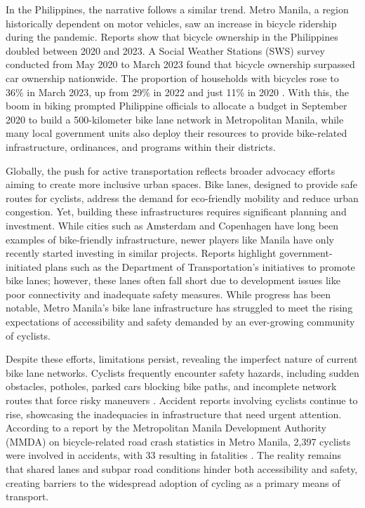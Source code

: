 In the Philippines, the narrative follows a similar trend. Metro Manila, a region historically dependent on motor vehicles, saw an increase in bicycle ridership during the pandemic. Reports show that bicycle ownership in the Philippines doubled between 2020 and 2023. A Social Weather Stations (SWS) survey conducted from May 2020 to March 2023 found that bicycle ownership surpassed car ownership nationwide. The proportion of households with bicycles rose to 36\% in March 2023, up from 29\% in 2022 and just 11\% in 2020 \citep{Cervantes:2023}. With this, the boom in biking prompted Philippine officials to allocate a budget in September 2020 to build a 500-kilometer bike lane network in Metropolitan Manila, while many local government units also deploy their resources to provide bike-related infrastructure, ordinances, and programs within their districts.

Globally, the push for active transportation reflects broader advocacy efforts aiming to create more inclusive urban spaces. Bike lanes, designed to provide safe routes for cyclists, address the demand for eco-friendly mobility and reduce urban congestion. Yet, building these infrastructures requires significant planning and investment. While cities such as Amsterdam and Copenhagen have long been examples of bike-friendly infrastructure, newer players like Manila have only recently started investing in similar projects. Reports highlight government-initiated plans such as the Department of Transportation's initiatives to promote bike lanes; however, these lanes often fall short due to development issues like poor connectivity and inadequate safety measures. While progress has been notable, Metro Manila's bike lane infrastructure has struggled to meet the rising expectations of accessibility and safety demanded by an ever-growing community of cyclists.

Despite these efforts, limitations persist, revealing the imperfect nature of current bike lane networks. Cyclists frequently encounter safety hazards, including sudden obstacles, potholes, parked cars blocking bike paths, and incomplete network routes that force risky maneuvers \citep{MNLBulletin:2023}. Accident reports involving cyclists continue to rise, showcasing the inadequacies in infrastructure that need urgent attention. According to a report by the Metropolitan Manila Development Authority (MMDA) on bicycle-related road crash statistics in Metro Manila, 2,397 cyclists were involved in accidents, with 33 resulting in fatalities \citep{MNLBulletin:2023}. The reality remains that shared lanes and subpar road conditions hinder both accessibility and safety, creating barriers to the widespread adoption of cycling as a primary means of transport.

